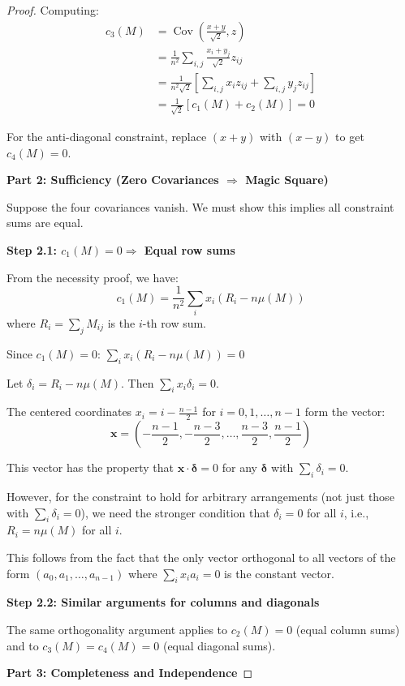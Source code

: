 \begin{proof}
Computing:
\begin{align}
c_3(M) &= \operatorname{Cov}\left(\frac{x+y}{\sqrt{2}}, z\right)\\
&= \frac{1}{n^2}\sum_{i,j}\frac{x_i + y_j}{\sqrt{2}} z_{ij}\\
&= \frac{1}{n^2\sqrt{2}}\left[\sum_{i,j}x_i z_{ij} + \sum_{i,j}y_j z_{ij}\right]\\
&= \frac{1}{\sqrt{2}}[c_1(M) + c_2(M)] = 0
\end{align}

For the anti-diagonal constraint, replace $(x+y)$ with $(x-y)$ to get $c_4(M) = 0$.

\textbf{Part 2: Sufficiency (Zero Covariances $\Rightarrow$ Magic Square)}

Suppose the four covariances vanish. We must show this implies all constraint sums are equal.

\textbf{Step 2.1: $c_1(M) = 0 \Rightarrow$ Equal row sums}

From the necessity proof, we have:
\[
c_1(M) = \frac{1}{n^2}\sum_{i}x_i(R_i - n\mu(M))
\]
where $R_i = \sum_{j} M_{ij}$ is the $i$-th row sum.

Since $c_1(M) = 0$: $\sum_{i}x_i(R_i - n\mu(M)) = 0$

Let $\delta_i = R_i - n\mu(M)$. Then $\sum_{i} x_i \delta_i = 0$.

The centered coordinates $x_i = i - \frac{n-1}{2}$ for $i = 0,1,\ldots,n-1$ form the vector:
\[
\mathbf{x} = \left(-\frac{n-1}{2}, -\frac{n-3}{2}, \ldots, \frac{n-3}{2}, \frac{n-1}{2}\right)
\]

This vector has the property that $\mathbf{x} \cdot \boldsymbol{\delta} = 0$ for any $\boldsymbol{\delta}$ with $\sum_i \delta_i = 0$.

However, for the constraint to hold for arbitrary arrangements (not just those with $\sum_i \delta_i = 0$), we need the stronger condition that $\delta_i = 0$ for all $i$, i.e., $R_i = n\mu(M)$ for all $i$.

This follows from the fact that the only vector orthogonal to all vectors of the form $(a_0, a_1, \ldots, a_{n-1})$ where $\sum_i x_i a_i = 0$ is the constant vector.

\textbf{Step 2.2: Similar arguments for columns and diagonals}

The same orthogonality argument applies to $c_2(M) = 0$ (equal column sums) and to $c_3(M) = c_4(M) = 0$ (equal diagonal sums).

\textbf{Part 3: Completeness and Independence}


\end{proof}
